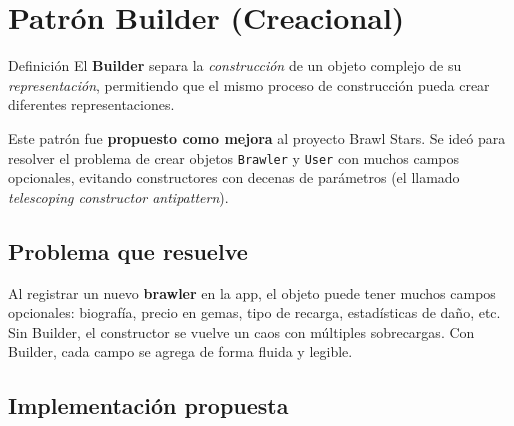 \documentclass[12pt,a4paper]{article}
\begin{document}
\newpage
\section{Patr\'on Builder (Creacional)}

\begin{patronbox}{Definici\'on}
El \textbf{Builder} separa la \textit{construcci\'on} de un objeto complejo de su \textit{representaci\'on}, permitiendo que el mismo proceso de construcci\'on pueda crear diferentes representaciones.
\end{patronbox}

\begin{tcolorbox}[colback=bsYellow!15, colframe=bsYellow!80!black, arc=3pt, title={\textbf{Nota de implementaci\'on}}, coltitle=black, fonttitle=\bfseries]
Este patr\'on fue \textbf{propuesto como mejora} al proyecto Brawl Stars. Se ide\'o para resolver el problema de crear objetos \texttt{Brawler} y \texttt{User} con muchos campos opcionales, evitando constructores con decenas de par\'ametros (el llamado \textit{telescoping constructor antipattern}).
\end{tcolorbox}

\subsection{Problema que resuelve}

Al registrar un nuevo \textbf{brawler} en la app, el objeto puede tener muchos campos opcionales: biograf\'ia, precio en gemas, tipo de recarga, estadísticas de da\~no, etc. Sin Builder, el constructor se vuelve un caos con m\'ultiples sobrecargas. Con Builder, cada campo se agrega de forma fluida y legible.

\subsection{Implementaci\'on propuesta}
\end{document}
